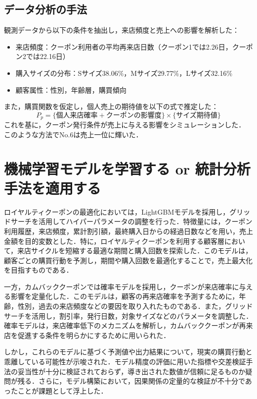 \documentclass[titlepage,a4paper]{jsarticle}
\begin{document}
\subsection{データ分析の手法}
観測データから以下の条件を抽出し，来店頻度と売上への影響を解析した：
\begin{itemize}
  \item 来店頻度：クーポン利用者の平均再来店日数（クーポン1では2.26日，クーポン2では22.16日）
  \item 購入サイズの分布：Sサイズ38.06\%，Mサイズ29.77\%，Lサイズ32.16\%
  \item 顧客属性：性別，年齢層，購買傾向
\end{itemize}

また，購買関数を仮定し，個人売上の期待値を以下の式で推定した：
\[
  P_{p} = \{ \text{個人来店確率} + \text{クーポンの影響度} \} \times \{ \text{サイズ期待値} \}
\]
これを基に，クーポン発行条件が売上に与える影響をシミュレーションした．\\


このような方法でNo.6は売上一位に輝いた．

\section{機械学習モデルを学習する or 統計分析手法を適用する}

ロイヤルティクーポンの最適化においては，LightGBMモデルを採用し，グリッドサーチを活用してハイパーパラメータの調整を行った．特徴量には，クーポン利用履歴，来店頻度，累計割引額，最終購入日からの経過日数などを用い，売上金額を目的変数とした．特に，ロイヤルティクーポンを利用する顧客層において，来店サイクルを短縮する最適な期間と購入回数を探索した．このモデルは，顧客ごとの購買行動を予測し，期間や購入回数を最適化することで，売上最大化を目指すものである．

一方，カムバッククーポンでは確率モデルを採用し，クーポンが来店確率に与える影響を定量化した．このモデルは，顧客の再来店確率を予測するために，年齢，性別，過去の来店頻度などの要因を取り入れたものである．また，グリッドサーチを活用し，割引率，発行日数，対象サイズなどのパラメータを調整した．確率モデルは，来店確率低下のメカニズムを解析し，カムバッククーポンが再来店を促進する条件を明らかにするために用いられた．

しかし，これらのモデルに基づく予測値や出力結果について，現実の購買行動と乖離している可能性が示唆された．モデル精度の評価に用いた指標や交差検証手法の妥当性が十分に検証されておらず，導き出された数値が信頼に足るものか疑問が残る．さらに，モデル構築において，因果関係の定量的な検証が不十分であったことが課題として浮上した．
\end{document}
